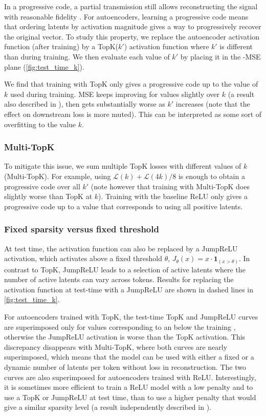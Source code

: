 In a progressive code, a partial transmission still allows reconstructing the signal with reasonable fidelity \citep{skodras2001jpeg}.  For autoencoders, learning a progressive code means that ordering latents by activation magnitude gives a way to progressively recover the original vector. To study this property, we replace the autoencoder activation function (after training) by a TopK($k'$) activation function where $k'$ is different than during training. We then evaluate each value of $k'$ by placing it in the \Lzero-MSE plane (\autoref{fig:test_time_k}).

We find that training with TopK only gives a progressive code up to the value of $k$ used during training. MSE keeps improving for values slightly over $k$ (a result also described in \citep{makhzani2013k}),  then gets substantially worse as $k'$ increases (note that the effect on downstream loss is more muted). This can be interpreted as some sort of overfitting to the value $k$.

\subsubsection{Multi-TopK}

To mitigate this issue, we sum multiple TopK losses with different values of $k$ (Multi-TopK). For example, using $\mathcal{L}(k) + \mathcal{L}(4 k)/8$ is enough to obtain a progressive code over all $k'$
(note however that training with Multi-TopK does slightly worse than TopK at $k$).
Training with the baseline ReLU only gives a progressive code up to a value that corresponds to using all positive latents. 



\subsubsection{Fixed sparsity versus fixed threshold}
\label{sec:jumprelu}

At test time, the activation function can also be replaced by a JumpReLU activation, which activates above a fixed threshold $\theta$, $J_{\theta}(x) = x \cdot \mathbf{1}_{(x > \theta)}$. In contrast to TopK, JumpReLU leads to a selection of active latents where the number of active latents can vary across tokens.
Results for replacing the activation function at test-time with a JumpReLU are shown in dashed lines in \autoref{fig:test_time_k}.  

For autoencoders trained with TopK, the test-time TopK and JumpReLU curves are superimposed only for values corresponding to an \Lzero below the training \Lzero, otherwise the JumpReLU activation is worse than the TopK activation. This discrepancy disappears with Multi-TopK, where both curves are nearly superimposed, which means that the model can be used with either a fixed or a dynamic number of latents per token without loss in reconstruction.
The two curves are also superimposed for autoencoders trained with ReLU.
Interestingly, it is sometimes more efficient to train a ReLU model with a low \Lone penalty and to use a TopK or JumpReLU at test time, than to use a higher \Lone penalty that would give a similar sparsity level (a result independently described in \citet{nanda2024progress}).

